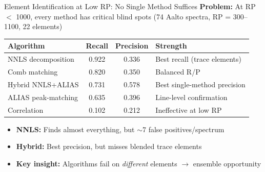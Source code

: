\documentclass[aspectratio=169,10pt]{beamer}
\begin{document}
\begin{frame}{Element Identification at Low RP: No Single Method Suffices}
	{\small\textbf{Problem:} At RP $<$ 1000, every method has critical blind spots
	\quad(74 Aalto spectra, RP = 300--1100, 22 elements)}

	\vspace{0.2em}
	\centering
	{\footnotesize
	\begin{tabular}{lccl}
		\toprule
		\textbf{Algorithm} & \textbf{Recall} & \textbf{Precision} & \textbf{Strength} \\
		\midrule
		NNLS decomposition  & \alert{0.922} & 0.336 & Best recall (trace elements) \\
		Comb matching       & 0.820 & 0.350 & Balanced R/P \\
		Hybrid NNLS+ALIAS   & 0.731 & \alert{0.578} & Best single-method precision \\
		ALIAS peak-matching & 0.635 & 0.396 & Line-level confirmation \\
		Correlation         & 0.102 & 0.212 & Ineffective at low RP \\
		\bottomrule
	\end{tabular}}

	\vspace{0.3em}
	\begin{itemize}
		\item {\small\textbf{NNLS:} Finds almost everything, but $\sim$7 false positives/spectrum}
		\item {\small\textbf{Hybrid:} Best precision, but misses blended trace elements}
		\item {\small\textbf{Key insight:} Algorithms fail on \emph{different} elements $\to$ ensemble opportunity}
	\end{itemize}
\end{frame}
\end{document}
